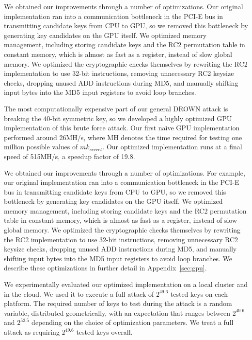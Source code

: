 \ifext
We obtained our improvements through a number of optimizations.  Our original implementation ran into a communication bottleneck in the PCI-E bus in transmitting candidate keys from CPU to GPU, so we removed this bottleneck by generating key candidates on the GPU itself.  We optimized memory management, including storing candidate keys and the RC2 permutation table in constant memory, which is almost as fast as a register, instead of slow global memory.  We optimized the cryptographic checks themselves by rewriting the RC2 implementation to use 32-bit instructions, removing unnecessary RC2 keysize checks, dropping unused ADD instructions during MD5, and manually shifting input bytes into the MD5 input registers to avoid loop branches.
\fi

\ifext

\label{sec:ec2_results}
\fi

The most computationally expensive part of our general DROWN attack is breaking the 40-bit symmetric key, so we developed a highly optimized GPU implementation of this brute force attack.  Our first na\"{\i}ve GPU implementation performed around 26MH/s, where MH denotes the time required for testing one million possible values of $mk_{secret}$. Our optimized implementation runs at a final speed of 515MH/s, a speedup factor of 19.8.  
\label{sec:gpu_brief}

We obtained our improvements through a number of optimizations.  For example, our original implementation ran into a communication bottleneck in the PCI-E bus in transmitting candidate keys from CPU to GPU, so we removed this bottleneck by generating key candidates on the GPU itself.  We optimized memory management, including storing candidate keys and the RC2 permutation table in constant memory, which is almost as fast as a register, instead of slow global memory. 
\ifext  We optimized the cryptographic checks themselves by rewriting the RC2 implementation to use 32-bit instructions, removing unnecessary RC2 keysize checks, dropping unused ADD instructions during MD5, and manually shifting input bytes into the MD5 input registers to avoid loop branches.  We describe these optimizations in further detail in Appendix~\ref{sec:gpu}. \fi

We experimentally evaluated our optimized implementation on a local cluster and in the cloud.
We used it to execute a full attack of $2^{49.6}$ tested keys on each platform.
The required number of keys to test during the attack is a random variable, distributed geometrically, with an expectation that ranges between $2^{49.6}$ and $2^{52.5}$ depending on the choice of optimization parameters.
We treat a full attack as requiring $2^{49.6}$ tested keys overall.

